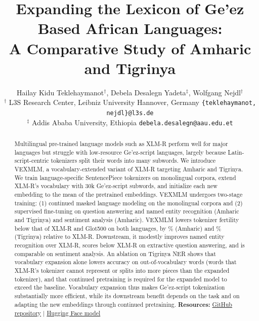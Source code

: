\documentclass[11pt]{article}
\title{Expanding the Lexicon of Ge'ez Based African Languages:\\A Comparative Study of Amharic and Tigrinya}
\author{
Hailay Kidu Teklehaymanot$^{\dagger}$,
Debela Desalegn Yadeta$^{\ddagger}$,
Wolfgang Nejdl$^{\dagger}$ \\
$^{\dagger}$ L3S Research Center, Leibniz University Hannover, Germany \texttt{\{teklehaymanot, nejdl\}@l3s.de}\\
$^{\ddagger}$ Addis Ababa University, Ethiopia \texttt {debela.desalegn@aau.edu.et}
}
\begin{document}
\maketitle
\begin{abstract}Multilingual pre-trained language models such as XLM-R perform well for major languages but struggle with low-resource Ge'ez-script languages, largely because Latin-script-centric tokenizers split their words into many subwords. We introduce VEXMLM, a vocabulary-extended variant of XLM-R targeting Amharic and Tigrinya. We train language-specific SentencePiece tokenizers on monolingual corpora, extend XLM-R's vocabulary with 30k Ge'ez-script subwords, and initialize each new embedding to the mean of the pretrained embeddings. VEXMLM undergoes two-stage training: (1) continued masked language modeling on the monolingual corpora and (2) supervised fine-tuning on question answering and named entity recognition (Amharic and Tigrinya) and sentiment analysis (Amharic). VEXMLM lowers tokenizer fertility below that of XLM-R and Glot500 on both languages, by \tokFertRedAmh\% (Amharic) and \tokFertRedTir\% (Tigrinya) relative to XLM-R. Downstream, it modestly improves named entity recognition over XLM-R, scores below XLM-R on extractive question answering, and is comparable on sentiment analysis. An ablation on Tigrinya NER shows that vocabulary expansion alone lowers accuracy on out-of-vocabulary words (words that XLM-R's tokenizer cannot represent or splits into more pieces than the expanded tokenizer), and that continued pretraining is required for the expanded model to exceed the baseline. Vocabulary expansion thus makes Ge'ez-script tokenization substantially more efficient, while its downstream benefit depends on the task and on adapting the new embeddings through continued pretraining.
\noindent
\textbf{Resources:}
\href{https://github.com/hailaykidu/VEXMLM}{GitHub repository}
\quad|\quad
\href{https://huggingface.co/Hailay/VEXMLM}{Hugging Face model}

\end{abstract}









%


%



\clearpage
\appendix
\end{document}
